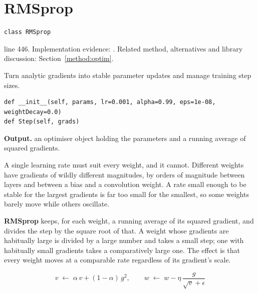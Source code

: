 \section{RMSprop}\label{fn:train:RMSprop}
\begin{lstlisting}[style=sig]
class RMSprop
\end{lstlisting}
 line 446. Implementation evidence: \cite{code2026}. Related method, alternatives and library discussion: Section~\ref{method:optim}.


Turn analytic gradients into stable parameter updates and manage training step sizes.


\begin{lstlisting}[style=plain]
def __init__(self, params, lr=0.001, alpha=0.99, eps=1e-08, weightDecay=0.0)
def Step(self, grads)
\end{lstlisting}


\noindent\textbf{Output.} an optimiser object holding the parameters and a running average of squared gradients.


A single learning rate must suit every weight, and it cannot. Different weights have gradients of wildly different magnitudes, by orders of magnitude between layers and between a bias and a convolution weight. A rate small enough to be stable for the largest gradients is far too small for the smallest, so some weights barely move while others oscillate.


\textbf{RMSprop} \cite{tieleman2012} keeps, for each weight, a running average of its squared gradient, and divides the step by the square root of that. A weight whose gradients are habitually large is divided by a large number and takes a small step; one with habitually small gradients takes a comparatively large one. The effect is that every weight moves at a comparable rate regardless of its gradient's scale.


\begin{equation}
v \;\leftarrow\; \alpha\,v + (1-\alpha)\,g^2, \qquad w \;\leftarrow\; w - \eta\,\frac{g}{\sqrt{v} + \epsilon}
\end{equation}

